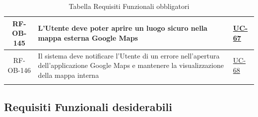 \documentclass[a4paper,12pt]{article}
\begin{document}
\begin{center}
\begin{longtable}{|c|p{8.5cm}|>{\centering\arraybackslash}p{4cm}|}
RF-OB-145 & L'Utente deve poter aprire un luogo sicuro nella mappa esterna Google Maps & \hyperref[subsec:UC-67]{UC-67} \\
\hline

RF-OB-146 & Il sistema deve notificare l'Utente di un errore nell'apertura dell'applicazione Google Maps e mantenere la visualizzazione della mappa interna & \hyperref[subsec:UC-68]{UC-68} \\
\hline
\caption{Tabella Requisiti Funzionali obbligatori} \label{tab:requisiti_funzionali_obbligatori} \\
\end{longtable}
\end{center}


\subsection{Requisiti Funzionali desiderabili} \label{subsection:requisiti_funzionali_desiderabili}
\end{document}
